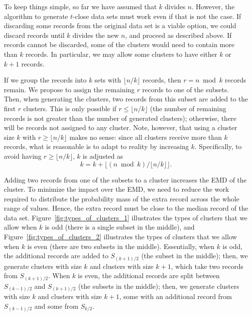 \documentclass[10pt,journal,compsoc]{IEEEtran}
\theoremstyle{definition}
\theoremstyle{plain}
\begin{document}
To keep things simple, so far we have assumed that $k$ divides
$n$. However, the algorithm to generate $t$-close data sets must
work even if that is not the case. If discarding some records from
the original data set is a viable option, we could discard records
until $k$ divides the new $n$, and proceed as described above. If
records cannot be discarded, some of the clusters would need to contain
more than $k$ records. In particular, we may allow some clusters to have
either $k$ or $k+1$ records.

If we group the records into $k$ sets with $\lfloor n/k \rfloor$ records, then
$r=n \bmod k$ records remain. We propose to assign the remaining
$r$ records to one of the subsets. Then, when generating the clusters, two
records from this subset are added to the first $r$ clusters. This
is only possible if 
$r \leq \lfloor n/k \rfloor$ (the number of remaining records is
not greater than the number of generated clusters); otherwise, there will be
records not assigned to any cluster. Note, however, that
using a cluster size $k$ with $r \geq \lfloor n/k \rfloor$ 
makes no sense: 
since all clusters receive more than $k$ records, what is reasonable
is to adapt to reality by increasing $k$.
Specifically, to avoid having $r \geq \lfloor n/k \rfloor$, $k$ is adjusted as
\begin{equation}
\label{adjust}
k=k+\lfloor (n \bmod k)/\lfloor n/k \rfloor \rfloor.
\end{equation}

Adding two records from one of the subsets to a cluster increases
the EMD of the cluster. To minimize the impact
over the EMD, we need to reduce the work required to distribute the
probability mass of the extra record across the whole range of values.
Hence, the extra record must be close to the median record of the
data set. Figure~\ref{fig:types_of_clusters_1} illustrates the types
of clusters that we allow when $k$ is odd (there is a single subset
in the middle), and Figure~\ref{fig:types_of_clusters_2} illustrates
the types of clusters that we allow when $k$ is even (there are two
subsets in the middle). Essentially, when $k$ is odd, the additional
records are added to $S_{(k+1)/2}$ (the subset in the middle); then, we
generate clusters with size $k$ and clusters with size $k+1$, which
take two records from $S_{(k+1)/2}$. When $k$ is even, the additional
records are split between $S_{(k-1)/2}$ and $S_{(k+1)/2}$ (the
subsets in the middle); then, we generate clusters with size $k$ and clusters
with size $k+1$, some with an additional record from $S_{(k-1)/2}$
and some from $S_{k/2}$.
\end{document}

